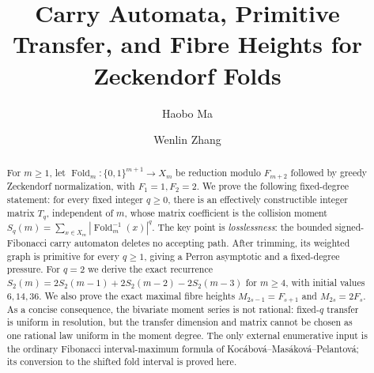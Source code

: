 \documentclass{amsart}
\title[Carry automata for Zeckendorf fold moments]
{Carry Automata, Primitive Transfer, and Fibre Heights for Zeckendorf Folds}
\author{Haobo Ma}
\author{Wenlin Zhang}
\date{}
\newcommand{\printreferences}{}
\theoremstyle{plain}
\theoremstyle{definition}
\theoremstyle{remark}
\DeclareMathOperator{\Fold}{Fold}
\begin{document}
\begin{abstract}
For \(m\ge1\), let \(\Fold_m:\{0,1\}^{m+1}\to X_m\) be reduction modulo
\(F_{m+2}\) followed by greedy Zeckendorf normalization, with
\(F_1=1,F_2=2\).  We prove the following fixed-degree statement: for every
fixed integer \(q\ge0\), there is an effectively constructible integer matrix
\(T_q\), independent of \(m\), whose matrix coefficient is the collision
moment \(S_q(m)=\sum_{x\in X_m}|\Fold_m^{-1}(x)|^q\).  The key point is
\emph{losslessness}: the bounded signed-Fibonacci carry automaton deletes no
accepting path.  After trimming, its weighted graph is primitive for every
\(q\ge1\), giving a Perron asymptotic and a fixed-degree pressure.  For \(q=2\)
we derive the exact recurrence
\(S_2(m)=2S_2(m-1)+2S_2(m-2)-2S_2(m-3)\) for \(m\ge4\), with initial
values \(6,14,36\).  We also prove the exact maximal fibre heights
\(M_{2s-1}=F_{s+1}\) and \(M_{2s}=2F_s\).  As a concise consequence, the bivariate
moment series is not rational: fixed-\(q\) transfer is uniform in resolution,
but the transfer dimension and matrix cannot be chosen as one rational law
uniform in the moment degree.  The only external enumerative input is the
ordinary Fibonacci interval-maximum formula of Kocábová--Masáková--Pelantová;
its conversion to the shifted fold interval is proved here.
\end{abstract}

\maketitle








\printreferences
\end{document}

